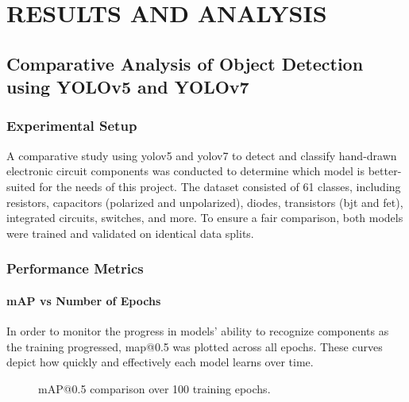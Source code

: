 \chapter{RESULTS AND ANALYSIS}

\section{Comparative Analysis of Object Detection using YOLOv5 and YOLOv7}

\subsection{Experimental Setup}

A comparative study using \gls{yolo}v5 and \gls{yolo}v7 to detect and classify hand-drawn electronic circuit components was conducted to determine which model is better-suited for the needs of this project. The dataset consisted of 61 classes, including resistors, capacitors (polarized and unpolarized), diodes, transistors (\gls{bjt} and \gls{fet}), integrated circuits, switches, and more. To ensure a fair comparison, both models were trained and validated on identical data splits.

\subsection{Performance Metrics}

\subsubsection{mAP vs Number of Epochs}

In order to monitor the progress in models' ability to recognize components as the training progressed, \gls{map}@0.5 was plotted across all epochs. These curves depict how quickly and effectively each model learns over time.

\begin{figure}[htbp]
    \centering
    \caption{mAP@0.5 comparison over 100 training epochs.}
    \label{fig:map_epochs}
\end{figure}

